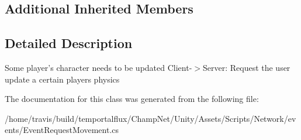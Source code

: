 \subsection*{Additional Inherited Members}


\subsection{Detailed Description}
Some player's character needs to be updated Client-\/$>$Server\-: Request the user update a certain players physics 

The documentation for this class was generated from the following file\-:\begin{DoxyCompactItemize}
\item 
/home/travis/build/temportalflux/\-Champ\-Net/\-Unity/\-Assets/\-Scripts/\-Network/events/Event\-Request\-Movement.\-cs\end{DoxyCompactItemize}
